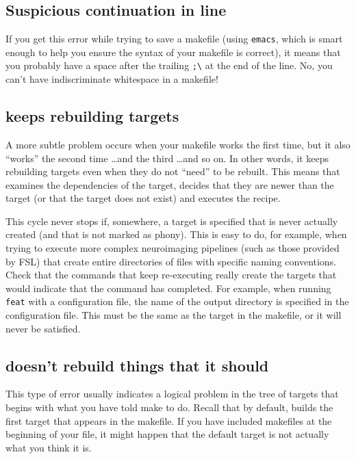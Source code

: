 \subsection{Suspicious continuation in line \mypound{}} %

If you get this error while trying to save a makefile (using \texttt{emacs}, which is smart enough to help you ensure the syntax of your makefile is correct), it means that you probably have a space after the trailing \texttt{;\textbackslash} at the end of the line. No, you can't have indiscriminate whitespace in a makefile!

\subsection{\maken{} keeps rebuilding targets}

A more subtle problem occurs when your makefile works the first time, but it also ``works'' the second time \ldots and the third \ldots and so on. In other words, it keeps rebuilding targets even when they do not ``need'' to be rebuilt. This means that \maken{} examines the dependencies of the target, decides that they are newer than the target (or that the target does not exist) and executes the recipe.

This cycle never stops if, somewhere, a target is specified that is never actually created (and that is not marked as phony). This is easy to do, for example, when trying to execute more complex neuroimaging pipelines (such as those provided by FSL) that create entire directories of files with specific naming conventions. Check that the commands that keep re-executing really create the targets that would indicate that the command has completed. For example, when running \texttt{feat} with a configuration file, the name of the output directory is specified in the configuration file. This must be the same as the target in the makefile, or it will never be satisfied.

\subsection{\maken{} doesn't rebuild things that it should}

This type of error usually indicates a logical problem in the tree of targets that begins with what you have told make to do. Recall that by default, \maken{} builds the first target that appears in the makefile. If you have included makefiles at the beginning of your file, it might happen that the default target is not actually what you think it is.
